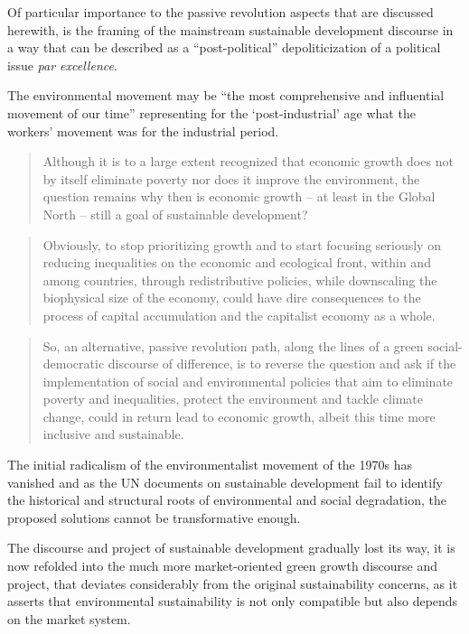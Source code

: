 \documentclass[
]{book}
\begin{document}
Of particular importance to the passive revolution aspects that are discussed herewith, is the framing of
the mainstream sustainable development discourse in a way that can be described as a ``post-political''
depoliticization of a political issue \emph{par excellence}.

The environmental movement may be ``the most comprehensive and influential
movement of our time'' representing for the `post-industrial' age what the workers'
movement was for the industrial period.

\begin{quote}
Although it is to a large extent recognized that economic growth does not by itself eliminate
poverty nor does it improve the environment, the question remains why then is economic growth -- at least in
the Global North -- still a goal of sustainable development?
\end{quote}

\begin{quote}
Obviously, to stop prioritizing growth and to start
focusing seriously on reducing inequalities on the economic and ecological front, within and among countries,
through redistributive policies, while downscaling the biophysical size of the economy, could have dire
consequences to the process of capital accumulation and the capitalist economy as a whole.
\end{quote}

\begin{quote}
So, an alternative,
passive revolution path, along the lines of a green social-democratic discourse of difference, is to reverse the
question and ask if the implementation of social and environmental policies that aim to eliminate poverty and
inequalities, protect the environment and tackle climate change, could in return lead to economic growth, albeit
this time more inclusive and sustainable.
\end{quote}

The initial radicalism of the
environmentalist movement of the 1970s has vanished and as the UN documents on sustainable development
fail to identify the historical and structural roots of environmental and social degradation, the proposed solutions
cannot be transformative enough.

The discourse and project of sustainable development gradually lost its way, it is now
refolded into the much more market-oriented green growth discourse and project, that deviates considerably
from the original sustainability concerns, as it asserts that environmental sustainability is not only compatible
but also depends on the market system.
\end{document}
